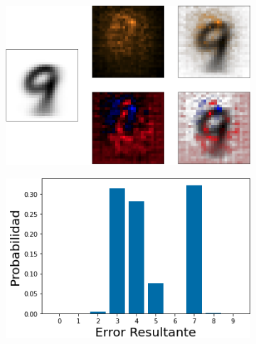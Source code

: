 \begin{figure}[h!]
    \centering
    \begin{subfigure}[b]{0.47\textwidth}
        \centering
        \includegraphics[width=\textwidth]{images/saliency/mnist/nonlinear/9_saliency_figures.png}
        \caption{}
        \label{9_saliency_nonlin}
    \end{subfigure}
    \hfill
    \begin{subfigure}[b]{0.47\textwidth}
        \centering
        \includegraphics[width=\textwidth]{images/saliency/mnist/nonlinear/9_error.png}
        \caption{}
        \label{9_error_nonlin}
    \end{subfigure}
    \caption{}
    \label{9_SAL_NONLIN}
\end{figure}


